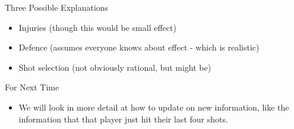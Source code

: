 \documentclass[
  ignorenonframetext,
]{beamer}
\providecommand{\tightlist}{%
  \setlength{\itemsep}{0pt}\setlength{\parskip}{0pt}}
\renewcommand{\,}{\text{, }}
\begin{document}
\begin{frame}{Three Possible Explanations}
\protect\hypertarget{three-possible-explanations}{}

\begin{itemize}[<+->]
\tightlist
\item
  Injuries (though this would be small effect)
\item
  Defence (assumes everyone knows about effect - which is realistic)
\item
  Shot selection (not obviously rational, but might be)
\end{itemize}

\end{frame}

\begin{frame}{For Next Time}
\protect\hypertarget{for-next-time}{}

\begin{itemize}
\tightlist
\item
  We will look in more detail at how to update on new information, like
  the information that that player just hit their last four shots.
\end{itemize}

\end{frame}
\end{document}
